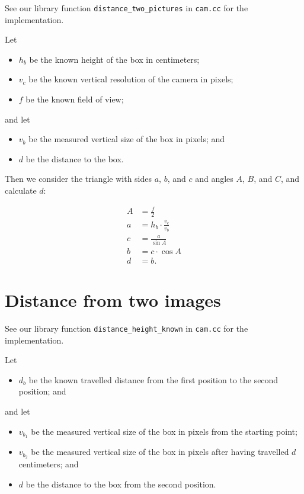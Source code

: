 \documentclass[a4paper,12pt]{article}
\begin{document}
See our library function \texttt{distance_two_pictures} in \texttt{cam.cc} for
the implementation.

Let
\begin{itemize}
\item $h_b$ be the known height of the box in centimeters;
\item $v_c$ be the known vertical resolution of the camera in pixels;
\item $f$ be the known field of view;
\end{itemize}

and let
\begin{itemize}
\item $v_b$ be the measured vertical size of the box in pixels; and
\item $d$ be the distance to the box.
\end{itemize}

Then we consider the triangle with sides $a$, $b$, and $c$ and angles $A$, $B$,
and $C$, and calculate $d$:

\begin{align*}
  A &= \frac{f}{2}\\
  a &= h_b \cdot \frac{v_c}{v_b}\\
  c &= \frac{a}{\sin A}\\
  b &= c \cdot \cos A\\
  d &= b.
\end{align*}


\section{Distance from two images}

See our library function \texttt{distance_height_known} in \texttt{cam.cc} for
the implementation.

Let

\begin{itemize}
\item $d_b$ be the known travelled distance from the first position to the
second position; and
\end{itemize}

and let

\begin{itemize}
\item $v_{b_1}$ be the measured vertical size of the box in pixels from the
starting point;
\item $v_{b_2}$ be the measured vertical size of the box in pixels after having
travelled $d$ centimeters; and
\item $d$ be the distance to the box from the second position.
\end{itemize}
\end{document}
